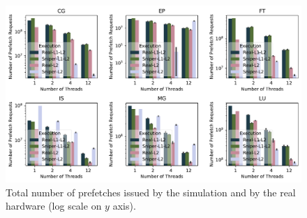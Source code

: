 \documentclass[AMA,final,STIX1COL]{WileyNJD-v2}
\begin{document}

\begin{figure}[b]
    \centering
    \includegraphics[width=.8\linewidth]{figures/sniper_l2-rqsts-all-pf.pdf}
    \caption{Total number of prefetches issued by the simulation and by the real hardware (log scale on $y$ axis).}
    \label{fig:sniper_l2-rqsts-all-pf}
\end{figure}
\end{document}
